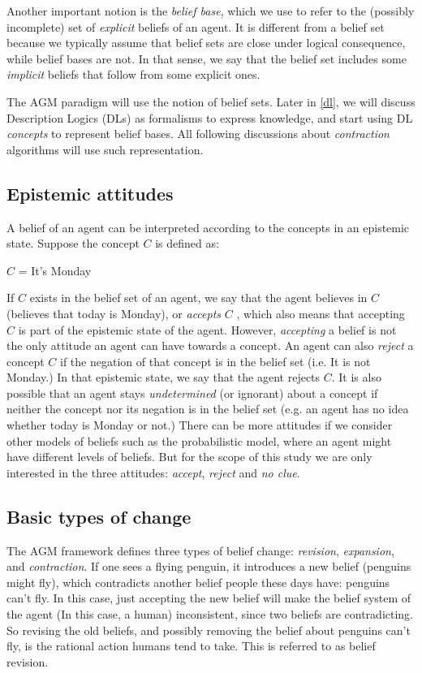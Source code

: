 \documentclass{sfuthesis}
\theoremstyle{plain}
\theoremstyle{definition}
\begin{document}
Another important notion is the \textit{belief base}, which we use to refer to the (possibly incomplete) set of \textit{explicit} beliefs of an agent. It is different from a belief set because we typically assume that belief sets are close under logical consequence, while belief bases are not. In that sense, we say that the belief set includes some \textit{implicit} beliefs that follow from some explicit ones.

The AGM paradigm will use the notion of belief sets. Later in \ref{dl}, we will discuss Description Logics (DLs) as formalisms to express knowledge, and start using DL \textit{concepts} to represent belief bases. All following discussions about \textit{contraction} algorithms will use such representation.


\subsection{Epistemic attitudes}
\label{epistemicAttitudes}
A belief of an agent can be interpreted according to the concepts in an epistemic state. Suppose the concept $C$ is defined as:
\begin{center}
$C$ = It's Monday
\end{center}
If $C$ exists in the belief set of an agent, we say that the agent believes in $C$ (believes that today is Monday), or \textit{accepts} $C$ \cite{flux}, which also means that accepting $C$ is part of the epistemic state of the agent. However, \textit{accepting} a belief is not the only attitude an agent can have towards a concept. An agent can also \textit{reject} a concept $C$ if the negation of that concept is in the belief set (i.e. It is not Monday.) In that epistemic state, we say that the agent rejects $C$. It is also possible that an agent stays \textit{undetermined} (or ignorant) about a concept if neither the concept nor its negation is in the belief set (e.g. an agent has no idea whether today is Monday or not.) There can be more attitudes if we consider other models of beliefs such as the probabilistic model, where an agent might have different levels of beliefs. But for the scope of this study we are only interested in the three attitudes: \textit{accept}, \textit{reject} and \textit{no clue}.

\subsection{Basic types of change}
The AGM framework defines three types of belief change: \textit{revision}, \textit{expansion}, and \textit{contraction}. If one sees a flying penguin, it introduces a new belief (penguins might fly), which contradicts another belief people these days have: penguins can't fly. In this case, just accepting the new belief will make the belief system of the agent (In this case, a human) inconsistent, since two beliefs are contradicting. So revising the old beliefs, and possibly removing the belief about penguins can't fly, is the rational action humans tend to take. This is referred to as belief revision.
\end{document}
